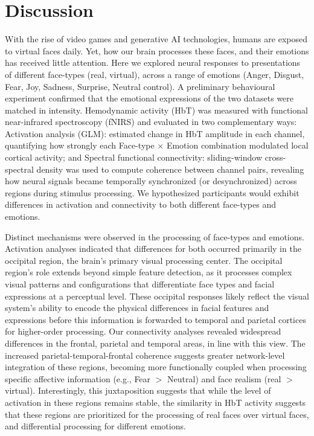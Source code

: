 \section*{Discussion}
With the rise of video games and generative AI technologies, humans are exposed to virtual faces daily. 
Yet, how our brain processes these faces, and their emotions has received little attention. 
Here we explored neural responses to presentations of different face-types (real, virtual), across a range of emotions (Anger, Disgust, Fear, Joy, Sadness, Surprise, Neutral control). 
A preliminary behavioural experiment confirmed that the emotional expressions of the two datasets were matched in intensity. 
Hemodynamic activity (HbT) was measured with functional near-infrared spectroscopy (fNIRS) and evaluated in two complementary ways: Activation analysis (GLM): estimated change in HbT amplitude in each channel, quantifying how strongly each Face-type \texorpdfstring{$\times$}{x} Emotion combination modulated local cortical activity; and Spectral functional connectivity: sliding-window cross-spectral density was used to compute coherence between channel pairs, revealing how neural signals became temporally synchronized (or desynchronized) across regions during stimulus processing. 
We hypothesized participants would exhibit differences in activation and connectivity to both different face-types and emotions. 

Distinct mechanisms were observed in the processing of face-types and emotions. 
Activation analyses indicated that differences for both occurred primarily in the occipital region, the brain's primary visual processing center. 
The occipital region's role extends beyond simple feature detection, as it processes complex visual patterns and configurations that differentiate face types and facial expressions at a perceptual level. 
These occipital responses likely reflect the visual system's ability to encode the physical differences in facial features and expressions before this information is forwarded to temporal and parietal cortices for higher-order processing. 
Our connectivity analyses revealed widespread differences in the frontal, parietal and temporal areas, in line with this view. 
The increased parietal-temporal-frontal coherence suggests greater network-level integration of these regions, becoming more functionally coupled when processing specific affective information (e.g., Fear $>$ Neutral) and face realism (real $>$ virtual).
Interestingly, this juxtaposition suggests that while the level of activation in these regions remains stable, the similarity in HbT activity suggests that these regions are prioritized for the processing of real faces over virtual faces, and differential processing for different emotions.

